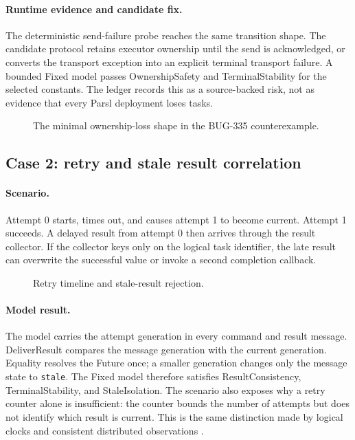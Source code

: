 \documentclass[11pt,a4paper]{article}
\begin{document}
\paragraph{Runtime evidence and candidate fix.} The deterministic send-failure probe reaches the
same transition shape. The candidate protocol retains executor ownership until the send is
acknowledged, or converts the transport exception into an explicit terminal transport failure. A
bounded Fixed model passes OwnershipSafety and TerminalStability for the selected constants. The
ledger records this as a source-backed risk, not as evidence that every Parsl deployment loses
tasks.

\begin{figure}[h]
\centering
{}
\caption{The minimal ownership-loss shape in the BUG-335 counterexample.}
\label{fig:bug335}
\end{figure}

\subsection{Case 2: retry and stale result correlation}
\paragraph{Scenario.} Attempt 0 starts, times out, and causes attempt 1 to become current. Attempt
1 succeeds. A delayed result from attempt 0 then arrives through the result collector. If the
collector keys only on the logical task identifier, the late result can overwrite the successful
value or invoke a second completion callback.

\begin{figure}[h]
\centering
{}
\caption{Retry timeline and stale-result rejection.}
\label{fig:retry}
\end{figure}

\paragraph{Model result.} The model carries the attempt generation in every command and result
message. DeliverResult compares the message generation with the current generation. Equality
resolves the Future once; a smaller generation changes only the message state to \texttt{stale}.
The Fixed model therefore satisfies ResultConsistency, TerminalStability, and StaleIsolation.
The scenario also exposes why a retry counter alone is insufficient: the counter bounds the number
of attempts but does not identify which result is current. This is the same distinction made by
logical clocks and consistent distributed observations
\cite{lamport1978time,chandy1985snapshot,herlihy1990linearizability}.
\end{document}
